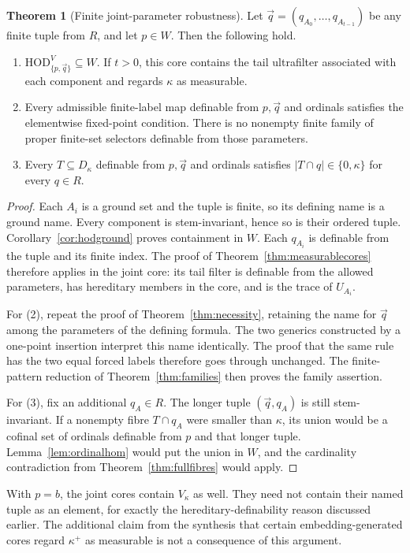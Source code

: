 \documentclass[11pt,letterpaper]{article}
\theoremstyle{definition}
\newtheorem{theorem}[definition]{Theorem}
\numberwithin{equation}{section}
\newcommand{\HOD}{\mathrm{HOD}}
\begin{document}
\begin{theorem}[Finite joint-parameter robustness]\label{thm:joint}
Let $\vec q=(q_{A_0},\ldots,q_{A_{t-1}})$ be any finite tuple from $R$, and let $p\in W$. Then the following hold.
\begin{enumerate}
\item $\HOD_{\{p,\vec q\}}^V\subseteq W$. If $t>0$, this core contains the tail ultrafilter associated with each component and regards $\kappa$ as measurable.
\item Every admissible finite-label map definable from $p,\vec q$ and ordinals satisfies the elementwise fixed-point condition. There is no nonempty finite family of proper finite-set selectors definable from those parameters.
\item Every $T\subseteq D_\kappa$ definable from $p,\vec q$ and ordinals satisfies $|T\cap q|\in\{0,\kappa\}$ for every $q\in R$.
\end{enumerate}
\end{theorem}
\begin{proof}
Each $A_i$ is a ground set and the tuple is finite, so its defining name is a ground name. Every component is stem-invariant, hence so is their ordered tuple. Corollary~\ref{cor:hodground} proves containment in $W$. Each $q_{A_i}$ is definable from the tuple and its finite index. The proof of Theorem~\ref{thm:measurablecores} therefore applies in the joint core: its tail filter is definable from the allowed parameters, has hereditary members in the core, and is the trace of $U_{A_i}$.

For (2), repeat the proof of Theorem~\ref{thm:necessity}, retaining the name for $\vec q$ among the parameters of the defining formula. The two generics constructed by a one-point insertion interpret this name identically. The proof that the same rule has the two equal forced labels therefore goes through unchanged. The finite-pattern reduction of Theorem~\ref{thm:families} then proves the family assertion.

For (3), fix an additional $q_A\in R$. The longer tuple $(\vec q,q_A)$ is still stem-invariant. If a nonempty fibre $T\cap q_A$ were smaller than $\kappa$, its union would be a cofinal set of ordinals definable from $p$ and that longer tuple. Lemma~\ref{lem:ordinalhom} would put the union in $W$, and the cardinality contradiction from Theorem~\ref{thm:fullfibres} would apply.
\end{proof}

With $p=b$, the joint cores contain $V_\kappa$ as well. They need not contain their named tuple as an element, for exactly the hereditary-definability reason discussed earlier. The additional claim from the synthesis that certain embedding-generated cores regard $\kappa^+$ as measurable is not a consequence of this argument.
\end{document}
